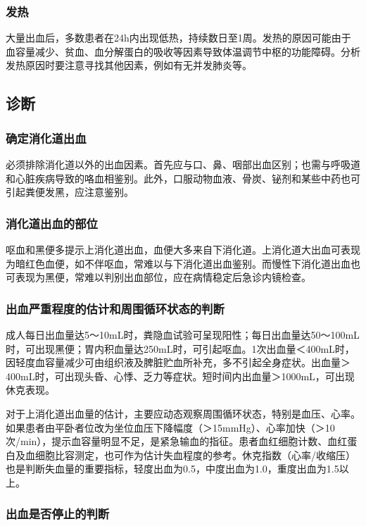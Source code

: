 \subsubsection{发热}

大量出血后，多数患者在24h内出现低热，持续数日至1周。发热的原因可能由于血容量减少、贫血、血分解蛋白的吸收等因素导致体温调节中枢的功能障碍。分析发热原因时要注意寻找其他因素，例如有无并发肺炎等。

\subsection{诊断}

\subsubsection{确定消化道出血}

必须排除消化道以外的出血因素。首先应与口、鼻、咽部出血区别；也需与呼吸道和心脏疾病导致的咯血相鉴别。此外，口服动物血液、骨炭、铋剂和某些中药也可引起粪便发黑，应注意鉴别。

\subsubsection{消化道出血的部位}

呕血和黑便多提示上消化道出血，血便大多来自下消化道。上消化道大出血可表现为暗红色血便，如不伴呕血，常难以与下消化道出血鉴别。而慢性下消化道出血也可表现为黑便，常难以判别出血部位，应在病情稳定后急诊内镜检查。

\subsubsection{出血严重程度的估计和周围循环状态的判断}

成人每日出血量达5～10mL时，粪隐血试验可呈现阳性；每日出血量达50～100mL时，可出现黑便；胃内积血量达250mL时，可引起呕血。1次出血量＜400mL时，因轻度血容量减少可由组织液及脾脏贮血所补充，多不引起全身症状。出血量＞400mL时，可出现头昏、心悸、乏力等症状。短时间内出血量＞1000mL，可出现休克表现。

对于上消化道出血量的估计，主要应动态观察周围循环状态，特别是血压、心率。如果患者由平卧者位改为坐位血压下降幅度（＞15mmHg）、心率加快（＞10次/min），提示血容量明显不足，是紧急输血的指征。患者血红细胞计数、血红蛋白及血细胞比容测定，也可作为估计失血程度的参考。休克指数（心率/收缩压）也是判断失血量的重要指标，轻度出血为0.5，中度出血为1.0，重度出血为1.5以上。

\subsubsection{出血是否停止的判断}

